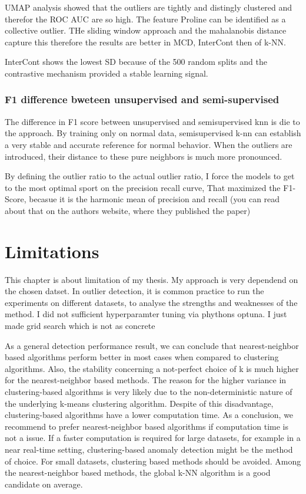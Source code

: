 UMAP analysis showed that the outliers are tightly and distingly clustered and therefor the ROC AUC are so high. 
The feature Proline can be identified as a collective outlier. THe sliding window approach and the mahalanobis distance capture this therefore the results are better in MCD, InterCont then of k-NN.


InterCont shows the lowest SD because of the 500 random splits and the contrastive mechanism provided a stable learning signal. 

\subsubsection*{F1 difference bweteen unsupervised and semi-supervised}
The difference in F1 score between unsupervised and semisupervised knn is die to the approach. 
By training only on normal data, semisupervised k-nn can establish a very stable and accurate reference for normal behavior. 
When the outliers are introduced, their distance to these pure neighbors is much more pronounced. 


By defining the outlier ratio to the actual outlier ratio, I force the models to get to the most optimal sport on the precision recall curve,
That maximized the F1-Score, becasue it is the harmonic mean of precision and recall (you can read about that on the authors website, where they published the paper)

\section{Limitations}

This chapter is about limitation of my thesis.
My approach is very dependend on the chosen datset.
In outlier detection, it is common practice to run the experiments on different datasets, to analyse the strengths and weaknesses of the method.
I did not sufficient hyperparamter tuning via phythons optuna.
I just made grid search which is not as concrete 


As a general detection performance result, we can conclude that nearest-neighbor based algorithms perform better in most cases when compared to clustering algorithms. 
Also, the stability concerning a not-perfect choice of k is much higher for the nearest-neighbor based methods. 
The reason for the higher variance in clustering-based algorithms is very likely due to the non-deterministic nature of the underlying k-means clustering algorithm. 
Despite of this disadvantage, clustering-based algorithms have a lower computation time. 
As a conclusion, we recommend to prefer nearest-neighbor based algorithms if computation time is not a issue. 
If a faster computation is required for large datasets, for example in a near real-time setting, clustering-based anomaly detection might be the method of choice. 
For small datasets, clustering based methods should be avoided.
Among the nearest-neighbor based methods, the global k-NN algorithm is a good candidate on average.



